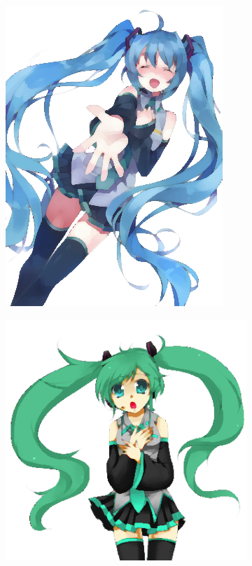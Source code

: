\begin{figure}[htb!]
\centering
\begin{subfigure}{.3\textwidth}
\includegraphics[width=\textwidth]{images/miku_e.png}
\end{subfigure}
\begin{subfigure}{.3\textwidth}
\includegraphics[width=\textwidth]{images/miku_c.png}

\end{subfigure}
\end{figure}
